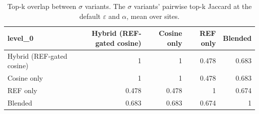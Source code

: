 \begin{table}[t]
\centering
\small
\caption{Top-k overlap between $\sigma$ variants. The $\sigma$ variants' pairwise top-k Jaccard at the default $\varepsilon$ and $\alpha$, mean over sites.}
\label{tab:t5_e7_sigma_pairs}
\begin{tabular}{lrrrr}
\toprule
level\_0 & Hybrid (REF-gated cosine) & Cosine only & REF only & Blended \\
\midrule
Hybrid (REF-gated cosine) & 1 & 1 & 0.478 & 0.683 \\
Cosine only & 1 & 1 & 0.478 & 0.683 \\
REF only & 0.478 & 0.478 & 1 & 0.674 \\
Blended & 0.683 & 0.683 & 0.674 & 1 \\
\bottomrule
\end{tabular}
\end{table}
